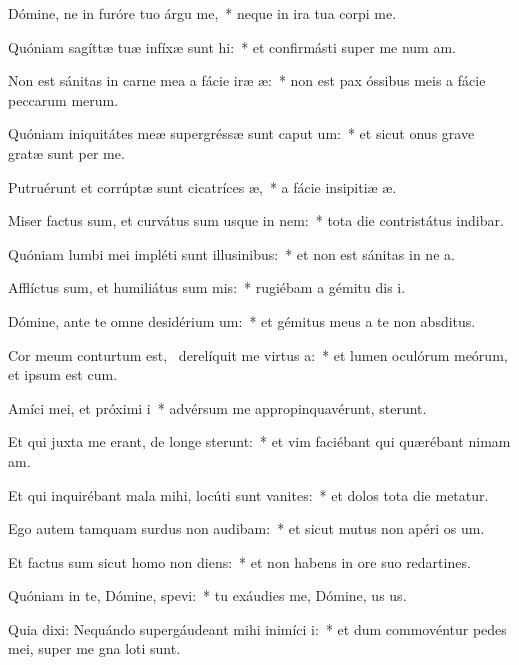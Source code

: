 \item Dómine, ne in furóre tuo árgu me,~* neque in ira tua corpi me.
\item Quóniam sagíttæ tuæ infíxæ sunt hi:~* et confirmásti super me num am.
\item Non est sánitas in carne mea a fácie iræ æ:~* non est pax óssibus meis a fácie peccarum merum.
\item Quóniam iniquitátes meæ supergréssæ sunt caput um:~* et sicut onus grave gratæ sunt per me.
\item Putruérunt et corrúptæ sunt cicatríces æ,~* a fácie insipitiæ æ.
\item Miser factus sum, et curvátus sum usque in nem:~* tota die contristátus indibar.
\item Quóniam lumbi mei impléti sunt illusinibus:~* et non est sánitas in ne a.
\item Afflíctus sum, et humiliátus sum mis:~* rugiébam a gémitu dis i.
\item Dómine, ante te omne desidérium um:~* et gémitus meus a te non  absditus.
\item Cor meum conturtum est,~\pscross{} derelíquit me virtus a:~* et lumen oculórum meórum, et ipsum  est cum.
\item Amíci mei, et próximi i~* advérsum me appropinquavérunt,  sterunt.
\item Et qui juxta me erant, de longe sterunt:~* et vim faciébant qui quærébant nimam am.
\item Et qui inquirébant mala mihi, locúti sunt vanites:~* et dolos tota die metatur.
\item Ego autem tamquam surdus non audibam:~* et sicut mutus non apéri os um.
\item Et factus sum sicut homo non diens:~* et non habens in ore suo redartines.
\item Quóniam in te, Dómine, spevi:~* tu exáudies me, Dómine, us us.
\item Quia dixi: Nequándo supergáudeant mihi inimíci i:~* et dum commovéntur pedes mei, super me gna loti sunt.
